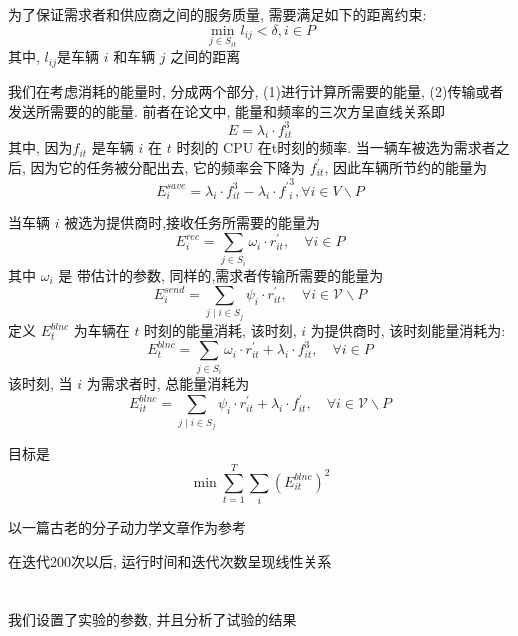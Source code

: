 \documentclass[a4paper]{article}
\begin{document}
为了保证需求者和供应商之间的服务质量, 需要满足如下的距离约束:
\begin{equation}
	\min\limits_{j \in S_{it} }
	l_{ij}<\delta
	,
	i \in P
\end{equation}
其中, $l_{ij}$是车辆 $i$ 和车辆 $j$ 之间的距离

我们在考虑消耗的能量时, 分成两个部分, (1)进行计算所需要的能量, (2)传输或者发送所需要的的能量. 前者在论文中, 能量和频率的三次方呈直线关系即
\begin{equation}
	E=\lambda_{i} \cdot f_{it}^{3} 
\end{equation}
其中, 因为$f_{it}$ 是车辆 $i$ 在 $t$ 时刻的 CPU 在t时刻的频率.
当一辆车被选为需求者之后, 因为它的任务被分配出去, 它的频率会下降为 $f^ \prime _{ it}$, 因此车辆所节约的能量为
\begin{equation}
		E_{i}^{save}
		=\lambda_{i} \cdot f_{it}^{3} -
		\lambda_{i} \cdot{f^{\prime}}_{i}^{3} , 
		\forall i \in V \backslash P
\end{equation}

当车辆 $i$ 被选为提供商时,接收任务所需要的能量为
\begin{equation}
	E_{i}^{r e c}=\sum_{j \in S_{i}} \omega_{i} \cdot r^{\prime}_{ it}, 
	\quad \forall i \in P
\end{equation}
其中 $\omega_i$ 是 带估计的参数, 
同样的,需求者传输所需要的能量为
\begin{equation}
	E_{i}^{send}=\sum_{j \mid i \in S_{j}} \psi_{i} \cdot r^{\prime}_{ it},
	 \quad \forall i \in \mathcal{V} \backslash P
\end{equation}
定义 $E^{blnc}_{t}$ 为车辆在 $t$ 时刻的能量消耗, 该时刻, $i$ 为提供商时, 该时刻能量消耗为:
\begin{equation}
	E^{blnc} _{t}=
	\sum_{j \in S_{i}} \omega_{i} \cdot r^{\prime}_{ it} +
	\lambda_{i} \cdot f_{it}^{3}
	, \quad \forall i \in P	
\end{equation}
该时刻, 当 $i$ 为需求者时, 总能量消耗为
\begin{equation}
	E^{blnc} _{it}=
	\sum_{j \mid i \in S_{j}} \psi_{i} \cdot r^{\prime}_{ it} +
	\lambda _i \cdot f ^ \prime _{it} ,
	\quad \forall i \in \mathcal{V} \backslash P
\end{equation}

目标是
\begin{equation}
	\min\sum \limits _{t=1} ^{T} \sum \limits _{i} (E^{blnc}_{it} )^ 2
\end{equation}



    以一篇古老的分子动力学文章作为参考\cite{yu2013toward}

	在迭代200次以后, 运行时间和迭代次数呈现线性关系



\section{}

我们设置了实验的参数, 并且分析了试验的结果









\end{document}
